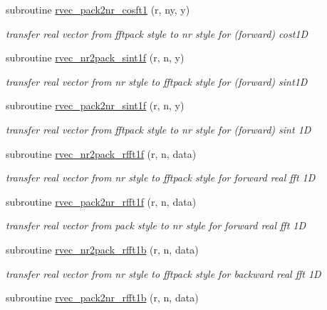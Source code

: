 \begin{DoxyCompactItemize}
subroutine \mbox{\hyperlink{namespacefftclass_a8f3b38a9f0433b6b847b670b98acab99}{rvec\+\_\+pack2nr\+\_\+cosft1}} (r, ny, y)
\begin{DoxyCompactList}\small\item\em transfer real vector from fftpack style to nr style for (forward) cost1D \end{DoxyCompactList}\item 
subroutine \mbox{\hyperlink{namespacefftclass_ae1f9bdd4e66db530852187dff115ae36}{rvec\+\_\+nr2pack\+\_\+sint1f}} (r, n, y)
\begin{DoxyCompactList}\small\item\em transfer real vector from nr style to fftpack style for (forward) sint1D \end{DoxyCompactList}\item 
subroutine \mbox{\hyperlink{namespacefftclass_a667b3d13eccd40bf9e60f379f6d44e04}{rvec\+\_\+pack2nr\+\_\+sint1f}} (r, n, y)
\begin{DoxyCompactList}\small\item\em transfer real vector from fftpack style to nr style for (forward) sint 1D \end{DoxyCompactList}\item 
subroutine \mbox{\hyperlink{namespacefftclass_ac09ed442a8bb7846768adbe2d5c798c6}{rvec\+\_\+nr2pack\+\_\+rfft1f}} (r, n, data)
\begin{DoxyCompactList}\small\item\em transfer real vector from nr style to fftpack style for forward real fft 1D \end{DoxyCompactList}\item 
subroutine \mbox{\hyperlink{namespacefftclass_ac898bf50e64ca8c43e8d9fa0c2c85919}{rvec\+\_\+pack2nr\+\_\+rfft1f}} (r, n, data)
\begin{DoxyCompactList}\small\item\em transfer real vector from pack style to nr style for forward real fft 1D \end{DoxyCompactList}\item 
subroutine \mbox{\hyperlink{namespacefftclass_a78a858cc72da790e88dc826f5bdd14b3}{rvec\+\_\+nr2pack\+\_\+rfft1b}} (r, n, data)
\begin{DoxyCompactList}\small\item\em transfer real vector from nr style to fftpack style for backward real fft 1D \end{DoxyCompactList}\item 
subroutine \mbox{\hyperlink{namespacefftclass_a49a850047c36eff6fb6d5eb1669cb009}{rvec\+\_\+pack2nr\+\_\+rfft1b}} (r, n, data)

\end{DoxyCompactItemize}
